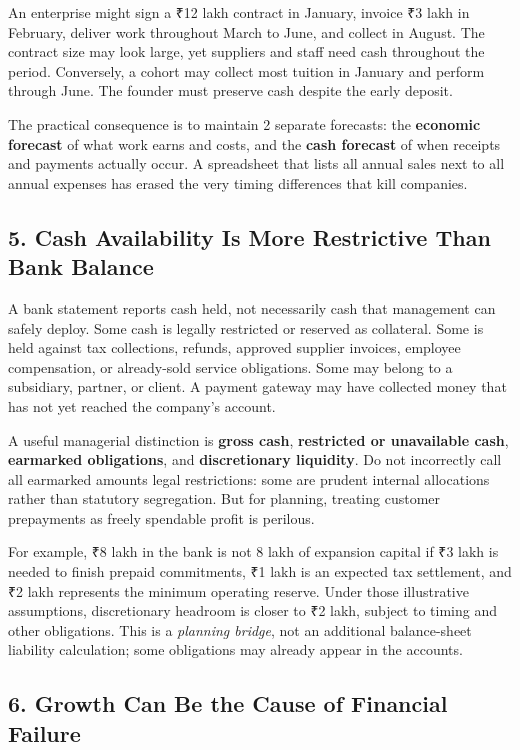 An enterprise might sign a ₹12 lakh contract in January, invoice ₹3 lakh in February, deliver work throughout March to June, and collect in August. The contract size may look large, yet suppliers and staff need cash throughout the period. Conversely, a cohort may collect most tuition in January and perform through June. The founder must preserve cash despite the early deposit.

The practical consequence is to maintain 2 separate forecasts: the \textbf{economic forecast} of what work earns and costs, and the \textbf{cash forecast} of when receipts and payments actually occur. A spreadsheet that lists all annual sales next to all annual expenses has erased the very timing differences that kill companies.

\subsection*{5. Cash Availability Is More Restrictive Than Bank Balance}

A bank statement reports cash held, not necessarily cash that management can safely deploy. Some cash is legally restricted or reserved as collateral. Some is held against tax collections, refunds, approved supplier invoices, employee compensation, or already-sold service obligations. Some may belong to a subsidiary, partner, or client. A payment gateway may have collected money that has not yet reached the company's account.

A useful managerial distinction is \textbf{gross cash}, \textbf{restricted or unavailable cash}, \textbf{earmarked obligations}, and \textbf{discretionary liquidity}. Do not incorrectly call all earmarked amounts legal restrictions: some are prudent internal allocations rather than statutory segregation. But for planning, treating customer prepayments as freely spendable profit is perilous.

For example, ₹8 lakh in the bank is not 8 lakh of expansion capital if ₹3 lakh is needed to finish prepaid commitments, ₹1 lakh is an expected tax settlement, and ₹2 lakh represents the minimum operating reserve. Under those illustrative assumptions, discretionary headroom is closer to ₹2 lakh, subject to timing and other obligations. This is a \emph{planning bridge}, not an additional balance-sheet liability calculation; some obligations may already appear in the accounts.

\subsection*{6. Growth Can Be the Cause of Financial Failure}

